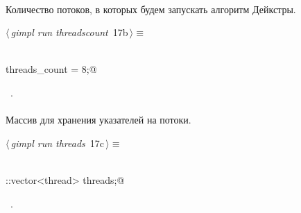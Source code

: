 \documentclass[12pt]{article}
\begin{document}
\paragraph{}
Количество потоков, в которых будем запускать алгоритм Дейкстры.
\begin{flushleft} \small
\begin{minipage}{\linewidth}\label{scrap28}\raggedright\small
{} $\langle\,${\itshape gimpl run threadscount}\nobreak\ {\footnotesize {17b}}$\,\rangle\equiv$
\vspace{-1ex}
\begin{list}{}{} \item
\mbox{}\verb@@\\
\mbox{}\verb@int threads_count = 8;@\\
\mbox{}\verb@@{\NWsep}
\end{list}
\vspace{-1.5ex}
\footnotesize
\begin{list}{}{\setlength{\itemsep}{-\parsep}\setlength{\itemindent}{-\leftmargin}}
\item \NWtxtMacroRefIn\ .

\item{}
\end{list}
\end{minipage}\vspace{4ex}
\end{flushleft}
\paragraph{}
Массив для хранения указателей на потоки.
\begin{flushleft} \small
\begin{minipage}{\linewidth}\label{scrap29}\raggedright\small
{} $\langle\,${\itshape gimpl run threads}\nobreak\ {\footnotesize {17c}}$\,\rangle\equiv$
\vspace{-1ex}
\begin{list}{}{} \item
\mbox{}\verb@@\\
\mbox{}\verb@std::vector<thread> threads;@\\
\mbox{}\verb@@{\NWsep}
\end{list}
\vspace{-1.5ex}
\footnotesize
\begin{list}{}{\setlength{\itemsep}{-\parsep}\setlength{\itemindent}{-\leftmargin}}
\item \NWtxtMacroRefIn\ .

\item{}
\end{list}
\end{minipage}\vspace{4ex}
\end{flushleft}
\end{document}
